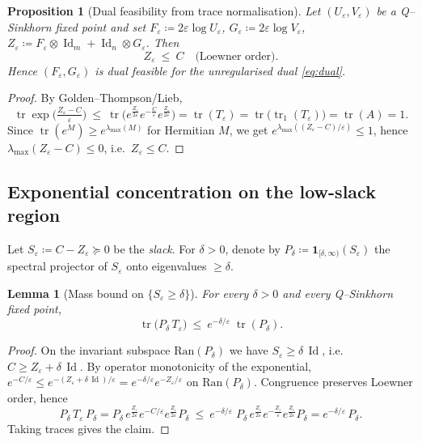 \documentclass[10pt]{article}
\newcommand{\Id}{\operatorname{Id}}
\newcommand{\tr}{\operatorname{tr}}
\renewcommand{\epsilon}{\varepsilon}
\newcommand{\eqdef}{\coloneqq}
\theoremstyle{plain}
\newtheorem{prop}{Proposition}
\newtheorem{lem}{Lemma}
\theoremstyle{definition}
\theoremstyle{remark}
\begin{document}
\begin{prop}[Dual feasibility from trace normalisation]\label{prop:dual-feas-fixed}
Let $(U_\epsilon,V_\epsilon)$ be a Q--Sinkhorn fixed point and set $F_\epsilon\eqdef2\epsilon\log U_\epsilon$, $G_\epsilon\eqdef2\epsilon\log V_\epsilon$, $Z_\epsilon\eqdef F_\epsilon\otimes\Id_m+\Id_n\otimes G_\epsilon$. Then
\[
Z_\epsilon\ \le\ C\quad\text{(Loewner order)}.
\]
Hence $(F_\epsilon,G_\epsilon)$ is dual feasible for the unregularised dual \eqref{eq:dual}.
\end{prop}

\begin{proof}
By Golden--Thompson/Lieb,
\[
\tr\!\exp\!\Big(\tfrac{Z_\epsilon-C}{\epsilon}\Big)\ \le\ \tr\!\Big(e^{\frac{Z_\epsilon}{2\epsilon}}e^{-\frac{C}{\epsilon}}e^{\frac{Z_\epsilon}{2\epsilon}}\Big)
=\tr(T_\epsilon)=\tr\big(\tr_1(T_\epsilon)\big)=\tr(A)=1.
\]
Since $\tr(e^{M})\ge e^{\lambda_{\max}(M)}$ for Hermitian $M$, we get
$e^{\lambda_{\max}((Z_\epsilon-C)/\epsilon)}\le 1$, hence $\lambda_{\max}(Z_\epsilon-C)\le 0$, i.e.\ $Z_\epsilon\le C$.
\end{proof}

\subsection*{Exponential concentration on the low-slack region}

Let $S_\epsilon\eqdef C-Z_\epsilon\succeq0$ be the \emph{slack}. For $\delta>0$, denote by
$P_\delta\eqdef\mathbf{1}_{[\delta,\infty)}(S_\epsilon)$ the spectral projector of $S_\epsilon$ onto eigenvalues $\ge \delta$.

\begin{lem}[Mass bound on $\{S_\epsilon\ge\delta\}$]\label{lem:mass-high-slack}
For every $\delta>0$ and every Q--Sinkhorn fixed point,
\[
\tr\!\big(P_\delta\,T_\epsilon\big)\ \le\ e^{-\delta/\epsilon}\;\tr(P_\delta).
\]
\end{lem}

\begin{proof}
On the invariant subspace $\mathrm{Ran}(P_\delta)$ we have $S_\epsilon\ge \delta\,\Id$, i.e.\ $C\ge Z_\epsilon+\delta\,\Id$. By operator monotonicity of the exponential,
$e^{-C/\epsilon}\le e^{-(Z_\epsilon+\delta\,\Id)/\epsilon}=e^{-\delta/\epsilon}e^{-Z_\epsilon/\epsilon}$ on $\mathrm{Ran}(P_\delta)$. Congruence preserves Loewner order, hence
\[
P_\delta\,T_\epsilon\,P_\delta
=P_\delta\,e^{\frac{Z_\epsilon}{2\epsilon}}e^{-C/\epsilon}e^{\frac{Z_\epsilon}{2\epsilon}}P_\delta
\ \le\ e^{-\delta/\epsilon}\;P_\delta\,e^{\frac{Z_\epsilon}{2\epsilon}}e^{-\frac{Z_\epsilon}{\epsilon}}e^{\frac{Z_\epsilon}{2\epsilon}}P_\delta
= e^{-\delta/\epsilon}\,P_\delta.
\]
Taking traces gives the claim.
\end{proof}
\end{document}
